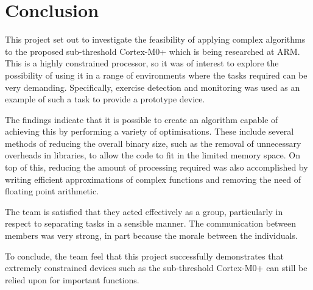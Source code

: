 \chapter{Conclusion}

This project set out to investigate the feasibility of applying complex algorithms to the proposed sub-threshold Cortex-M0+ which is being researched at ARM. This is a highly constrained processor, so it was of interest to explore the possibility of using it in a range of environments where the tasks required can be very demanding. Specifically, exercise detection and monitoring was used as an example of such a task to provide a prototype device.

The findings indicate that it is possible to create an algorithm capable of achieving this by performing a variety of optimisations. These include several methods of reducing the overall binary size, such as the removal of unnecessary overheads in libraries, to allow the code to fit in the limited memory space. On top of this, reducing the amount of processing required was also accomplished by writing efficient approximations of complex functions and removing the need of floating point arithmetic.

The team is satisﬁed that they acted eﬀectively as a group, particularly in respect to separating tasks in a sensible manner. The communication between members was very strong, in part because the morale between the individuals. 

To conclude, the team feel that this project successfully demonstrates that extremely constrained devices such as the sub-threshold Cortex-M0+ can still be relied upon for important functions.
